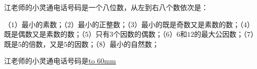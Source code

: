 江老师的小灵通电话号码是一个八位数，从左到右八个数依次是：
    
（$1$）最小的素数；（$2$）最小的正整数；（$3$）最小的既是奇数又是素数的数；（$4$）既是偶数又是素数的数；（$5$）只有$3$个因数的偶数；（$6$）$6$和$12$的最大公因数；（$7$）既是$5$的倍数，又是$5$的因数；（$8$）最小的自然数；
    
江老师的小灵通电话号码是\underline{\hbox to 60mm{}}
